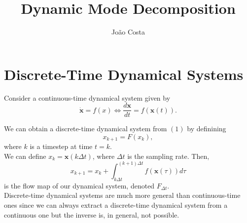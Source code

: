 \documentclass[]{article}
\title{Dynamic Mode Decomposition}
\author{João Costa}
\begin{document}
\maketitle

\section{Discrete-Time Dynamical Systems}
Consider a continuous-time dynamical system given by
\begin{equation}
	\dot{\mathbf{x}}=f(x) \iff \frac{d\mathbf{x}}{dt} = f(\mathbf{x}(t)).
\end{equation}

\noindent We can obtain a discrete-time dynamical system from $(1)$ by definining
\begin{equation}
	x_{k+1}=F(x_k),
\end{equation}
where $k$ is a timestep at time $t=k$. \\
We can define $x_k = \mathbf{x}(k \Delta t)$, where $\Delta t$ is the sampling rate. Then,
\begin{equation}
	x_{k+1}=x_k+\int_{k \Delta t}^{(k+1)\Delta t} f(\mathbf{x}(\tau)) d\tau
\end{equation}
is the flow map of our dynamical system, denoted $F_{\Delta t}$. \\
Discrete-time dynamical systems are much more general than continuous-time ones since we can always extract a discrete-time dynamical system from a continuous one but the inverse is, in general, not possible.
\end{document}
